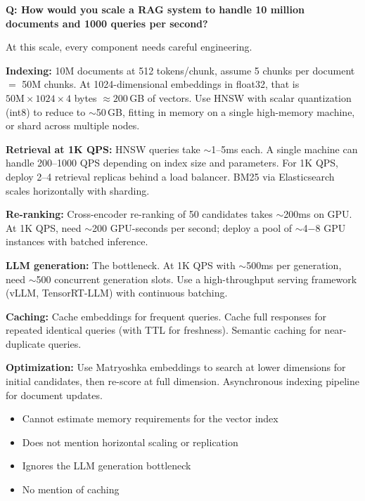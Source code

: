 \begin{interviewq}
\textbf{Q: How would you scale a RAG system to handle 10 million documents and
1000 queries per second?}

 \quad {} \quad \badgefreq{\freqmed}

\stronganswer
At this scale, every component needs careful engineering.

\textbf{Indexing:} 10M documents at 512 tokens/chunk, assume 5 chunks per
document $=$ 50M chunks.  At 1024-dimensional embeddings in float32, that is
$50\text{M} \times 1024 \times 4$ bytes $\approx 200$\,GB of vectors.  Use
HNSW with scalar quantization (int8) to reduce to $\sim$50\,GB, fitting in
memory on a single high-memory machine, or shard across multiple nodes.

\textbf{Retrieval at 1K QPS:} HNSW queries take $\sim$1--5ms each.
A single machine can handle 200--1000 QPS depending on index size and parameters.
For 1K QPS, deploy 2--4 retrieval replicas behind a load balancer.  BM25 via
Elasticsearch scales horizontally with sharding.

\textbf{Re-ranking:} Cross-encoder re-ranking of 50 candidates takes
$\sim$200ms on GPU.  At 1K QPS, need $\sim$200 GPU-seconds per second;
deploy a pool of $\sim$4$-$8 GPU instances with batched inference.

\textbf{LLM generation:} The bottleneck.  At 1K QPS with $\sim$500ms per
generation, need $\sim$500 concurrent generation slots.  Use a high-throughput
serving framework (vLLM, TensorRT-LLM) with continuous batching.

\textbf{Caching:} Cache embeddings for frequent queries.  Cache full responses
for repeated identical queries (with TTL for freshness).  Semantic caching for
near-duplicate queries.

\textbf{Optimization:} Use Matryoshka embeddings to search at lower dimensions
for initial candidates, then re-score at full dimension.  Asynchronous indexing
pipeline for document updates.

\redflags
\begin{itemize}
    \item Cannot estimate memory requirements for the vector index
    \item Does not mention horizontal scaling or replication
    \item Ignores the LLM generation bottleneck
    \item No mention of caching
\end{itemize}


\end{interviewq}
